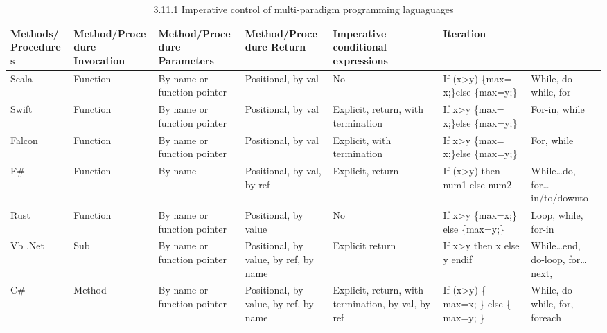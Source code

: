 \documentclass{sig-alternate}
\begin{document}


\begin{table}[]
\centering
\caption{3.11.1 Imperative control of multi-paradigm programming laguaguages}
\label{my-label}
\begin{tabular}{|l|l|l|l|l|l|l|}
\hline
Methods/Procedures & Method/Procedure Invocation & Method/Procedure Parameters & Method/Procedure Return               & Imperative conditional expressions                 & Iteration                                            &                               \\ \hline
Scala              & Function                    & By name or function pointer & Positional, by val                    & No                                                 & If (x\textgreater{}y) \{max= x;\}else \{max=y;\}     & While, do-while, for          \\ \hline
Swift              & Function                    & By name or function pointer & Positional, by val                    & Explicit, return, with termination                 & If x\textgreater{}y \{max= x;\}else \{max=y;\}       & For-in, while                 \\ \hline
Falcon             & Function                    & By name or function pointer & Positional, by val                    & Explicit, with termination                         & If x\textgreater{}y \{max= x;\}else \{max=y;\}       & For, while                    \\ \hline
F\#                & Function                    & By name                     & Positional, by val, by ref            & Explicit, return                                   & If (x\textgreater{}y) then num1 else num2            & While…do, for…in/to/downto    \\ \hline
Rust               & Function                    & By name or function pointer & Positional, by value                  & No                                                 & If x\textgreater{}y \{max=x;\} else \{max=y;\}       & Loop, while, for-in           \\ \hline
Vb .Net            & Sub                         & By name or function pointer & Positional, by value, by ref, by name & Explicit return                                    & If x\textgreater{}y then x else y endif              & While…end, do-loop, for…next, \\ \hline
C\#                & Method                      & By name or function pointer & Positional, by value, by ref, by name & Explicit, return, with termination, by val, by ref & If (x\textgreater{}y) \{ max=x; \} else \{ max=y; \} & While, do-while, for, foreach \\ \hline

\end{tabular}
\end{table}
\end{document}
